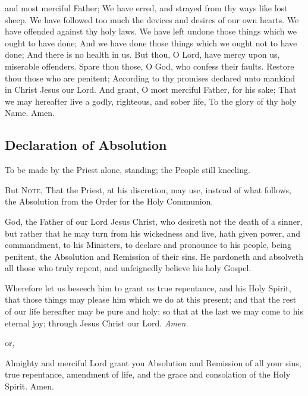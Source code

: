  and most merciful Father; We have erred, and strayed from thy ways like lost sheep. We have followed too much the devices and desires of our own hearts. We have offended against thy holy laws. We have left undone those things which we ought to have done; And we have done those things which we ought not to have done; And there is no health in us. But thou, O Lord, have mercy upon us, miserable offenders. Spare thou those, O God, who confess their faults. Restore thou those who are penitent; According to thy promises declared unto mankind in Christ Jesus our Lord. And grant, O most merciful Father, for his sake; That we may hereafter live a godly, righteous, and sober life, To the glory of thy holy Name. Amen.
\subsection{Declaration of Absolution}
\begin{rubric}
    To be made by the Priest alone, standing; the People still kneeling.
\end{rubric}
\begin{rubric}
    But \textsc{Note}, That the Priest, at his discretion, may use, instead of what follows, the Absolution from the Order for the Holy Communion.
\end{rubric}
 God, the Father of our Lord Jesus Christ, who desireth not the death of a sinner, but rather that he may turn from his wickedness and live, hath given power, and commandment, to his Ministers, to declare and pronounce to his people, being penitent, the Absolution and Remission of their sins. He pardoneth and {} absolveth all those who truly repent, and unfeignedly believe his holy Gospel.
\par
Wherefore let us beseech him to grant us true repentance, and his Holy Spirit, that those things may please him which we do at this present; and that the rest of our life hereafter may be pure and holy; so that at the last we may come to his eternal joy; through Jesus Christ our Lord. \textit{Amen.}
\begin{inhead}
    or,
\end{inhead}
 Almighty and merciful Lord grant you Absolution {} and Remission of all your sins, true repentance, amendment of life, and the grace and consolation of the Holy Spirit. Amen.

